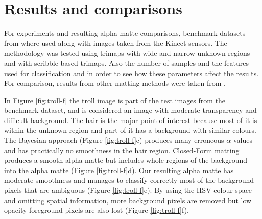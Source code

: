 \section{Results and comparisons}
\label{sec:results-and-comparisons}

For experiments and resulting alpha matte comparisons, benchmark datasets from \cite{benchmark} where used along with images taken from the Kinect sensors.
The methodology was tested using trimaps with wide and narrow unknown regions and with scribble based trimaps. Also the number of samples and the features used for classification and in order to see how these parameters affect the results.
For comparison, results from other matting methods were taken from \cite{benchmark}.
\par
In Figure \ref{fig:troll-f} the troll image is part of the test images from the benchmark dataset, and is considered an image with moderate transparency and difficult background. The hair is the major point of interest because most of it is within the unknown region and part of it has a background with similar colours. The Bayesian approach (Figure \ref{fig:troll-f}c) produces many erroneous $\alpha$ values and has practically no smoothness in the hair region. Closed-Form matting produces a smooth alpha matte but includes whole regions of the background into the alpha matte (Figure \ref{fig:troll-f}d). Our resulting alpha matte has moderate smoothness and manages to classify correctly most of the background pixels that are ambiguous (Figure \ref{fig:troll-f}e). By using the HSV colour space and omitting spatial information, more background pixels are removed but low opacity foreground pixels are also lost (Figure \ref{fig:troll-f}f).


